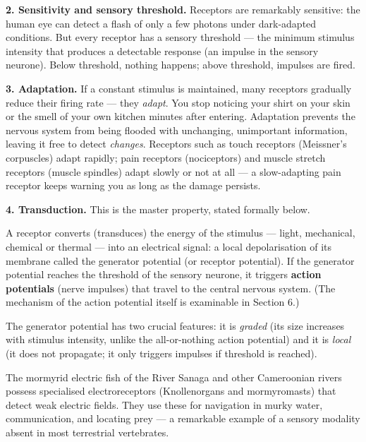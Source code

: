 \documentclass[11pt]{article}
\newcommand{\cle}[1]{{\popxbold\color{popdark}#1}}
\begin{document}
\textbf{2. Sensitivity and sensory threshold.} Receptors are remarkably sensitive: the human eye can detect a flash of only a few photons under dark-adapted conditions. But every receptor has a \cle{sensory threshold} — the minimum stimulus intensity that produces a detectable response (an impulse in the sensory neurone). Below threshold, nothing happens; above threshold, impulses are fired.

\textbf{3. Adaptation.} If a constant stimulus is maintained, many receptors gradually reduce their firing rate — they \emph{adapt}. You stop noticing your shirt on your skin or the smell of your own kitchen minutes after entering. Adaptation prevents the nervous system from being flooded with unchanging, unimportant information, leaving it free to detect \emph{changes}. Receptors such as touch receptors (Meissner's corpuscles) adapt rapidly; pain receptors (nociceptors) and muscle stretch receptors (muscle spindles) adapt slowly or not at all — a slow-adapting pain receptor keeps warning you as long as the damage persists.

\textbf{4. Transduction.} This is the master property, stated formally below.

\begin{propriete}
A receptor converts (transduces) the energy of the stimulus — light, mechanical, chemical or thermal — into an electrical signal: a local depolarisation of its membrane called the \cle{generator potential} (or receptor potential). If the generator potential reaches the threshold of the sensory neurone, it triggers \textbf{action potentials} (nerve impulses) that travel to the central nervous system. (The mechanism of the action potential itself is examinable in Section 6.)
\end{propriete}

The generator potential has two crucial features: it is \emph{graded} (its size increases with stimulus intensity, unlike the all-or-nothing action potential) and it is \emph{local} (it does not propagate; it only triggers impulses if threshold is reached).

\begin{savaistu}
The mormyrid electric fish of the River Sanaga and other Cameroonian rivers possess specialised electroreceptors (Knollenorgans and mormyromasts) that detect weak electric fields. They use these for navigation in murky water, communication, and locating prey — a remarkable example of a sensory modality absent in most terrestrial vertebrates.
\end{savaistu}
\end{document}
